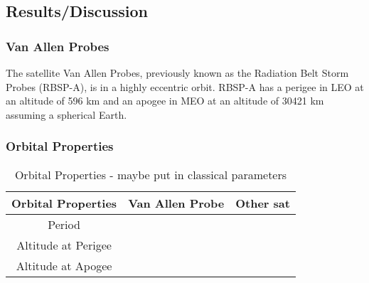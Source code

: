 \documentclass[Space3_Assign1.tex]{subfiles}
\begin{document}
\subsection{Results/Discussion}
\subsubsection{Van Allen Probes}
The satellite Van Allen Probes, previously known as the Radiation Belt Storm Probes (RBSP-A), is in a highly eccentric orbit. RBSP-A has a perigee in LEO at an altitude of 596 km and an apogee in MEO at an altitude of 30421 km assuming a spherical Earth. 


\subsubsection{Orbital Properties}
\begin{table}[h]
\centering
\caption{Orbital Properties - maybe put in classical parameters}
\begin{tabular}{|c|c|c|}
\hline
Orbital Properties & Van Allen Probe & Other sat \\\hline
Period & & \\\hline
Altitude at Perigee & & \\\hline
Altitude at Apogee & & \\\hline

\end{tabular}
\end{table}
\end{document}
